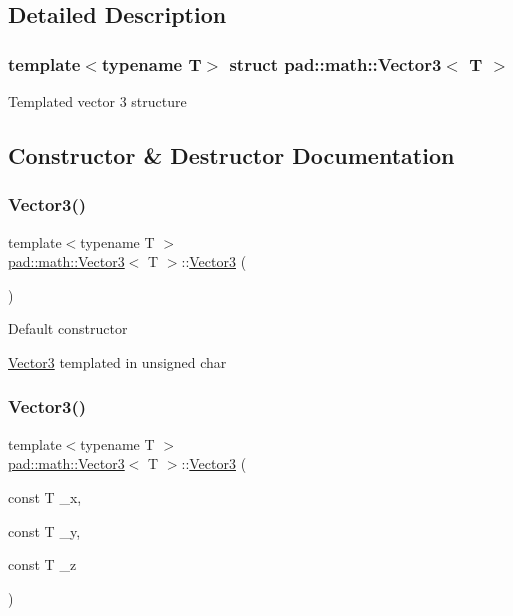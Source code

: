 \subsection{Detailed Description}
\subsubsection*{template$<$typename T$>$\newline
struct pad\+::math\+::\+Vector3$<$ T $>$}

Templated vector 3 structure 

\subsection{Constructor \& Destructor Documentation}
\mbox{\label{structpad_1_1math_1_1_vector3_a06aefc4e209e7e8ab954c9124e9f663f}} 
\subsubsection{\texorpdfstring{Vector3()}{Vector3()}\hspace{0.1cm}{\footnotesize\ttfamily [1/4]}}
{\footnotesize\ttfamily template$<$typename T $>$ \\
\mbox{\hyperlink{structpad_1_1math_1_1_vector3}{pad\+::math\+::\+Vector3}}$<$ T $>$\+::\mbox{\hyperlink{structpad_1_1math_1_1_vector3}{Vector3}} (\begin{DoxyParamCaption}{ }\end{DoxyParamCaption})}

Default constructor

\mbox{\hyperlink{structpad_1_1math_1_1_vector3}{Vector3}} templated in unsigned char \mbox{\label{structpad_1_1math_1_1_vector3_a0770fb886ae92f895ce0258e28a1a1eb}} 
\subsubsection{\texorpdfstring{Vector3()}{Vector3()}\hspace{0.1cm}{\footnotesize\ttfamily [2/4]}}
{\footnotesize\ttfamily template$<$typename T $>$ \\
\mbox{\hyperlink{structpad_1_1math_1_1_vector3}{pad\+::math\+::\+Vector3}}$<$ T $>$\+::\mbox{\hyperlink{structpad_1_1math_1_1_vector3}{Vector3}} (\begin{DoxyParamCaption}\item[{const T}]{\+\_\+x,  }\item[{const T}]{\+\_\+y,  }\item[{const T}]{\+\_\+z }\end{DoxyParamCaption})}


